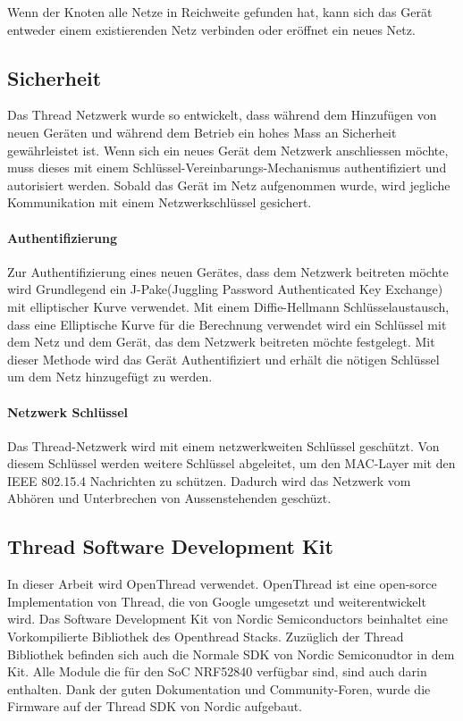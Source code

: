 Wenn der Knoten alle Netze in Reichweite gefunden hat, kann sich das Gerät entweder einem existierenden Netz verbinden oder eröffnet ein neues Netz.

\newpage

\subsection{Sicherheit}\label{subsec:Sicherheit}
Das Thread Netzwerk wurde so entwickelt, dass während dem Hinzufügen von neuen Geräten und während dem Betrieb ein hohes Mass an Sicherheit gewährleistet ist. Wenn sich ein neues Gerät dem Netzwerk anschliessen möchte, muss dieses mit einem Schlüssel-Vereinbarungs-Mechanismus authentifiziert und autorisiert werden. Sobald das Gerät im Netz aufgenommen wurde, wird jegliche Kommunikation mit einem Netzwerkschlüssel gesichert.

\paragraph{Authentifizierung}
Zur Authentifizierung eines neuen Gerätes, dass dem Netzwerk beitreten möchte wird Grundlegend ein J-Pake(Juggling Password Authenticated Key Exchange) mit elliptischer Kurve verwendet. Mit einem Diffie-Hellmann Schlüsselaustausch, dass eine Elliptische Kurve für die Berechnung verwendet wird ein Schlüssel mit dem Netz und dem Gerät, das dem Netzwerk beitreten möchte festgelegt. Mit dieser Methode wird das Gerät Authentifiziert und erhält die nötigen Schlüssel um dem Netz hinzugefügt zu werden. \cite[Seite 1-4]{thread_group_inc_thread_2017}

\paragraph{Netzwerk Schlüssel}
Das Thread-Netzwerk wird mit einem netzwerkweiten Schlüssel geschützt. Von diesem Schlüssel werden weitere Schlüssel abgeleitet, um den MAC-Layer mit den IEEE 802.15.4 Nachrichten zu schützen. Dadurch wird das Netzwerk vom Abhören und Unterbrechen von Aussenstehenden geschüzt.\cite[Seite 1-5]{thread_group_inc_thread_2017}

\subsection{Thread Software Development Kit}\label{subsec:ThreadSoftwareDevelopmentKit}
In dieser Arbeit wird OpenThread verwendet. OpenThread ist eine open-sorce Implementation von Thread, die von Google umgesetzt und weiterentwickelt wird. Das Software Development Kit von Nordic Semiconductors beinhaltet eine Vorkompilierte Bibliothek des Openthread Stacks. Zuzüglich der Thread Bibliothek befinden sich auch die Normale SDK von Nordic Semiconudtor in dem Kit. Alle Module die für den SoC NRF52840 verfügbar sind, sind auch darin enthalten. Dank der guten Dokumentation und Community-Foren, wurde die Firmware auf der Thread SDK von Nordic aufgebaut. 

